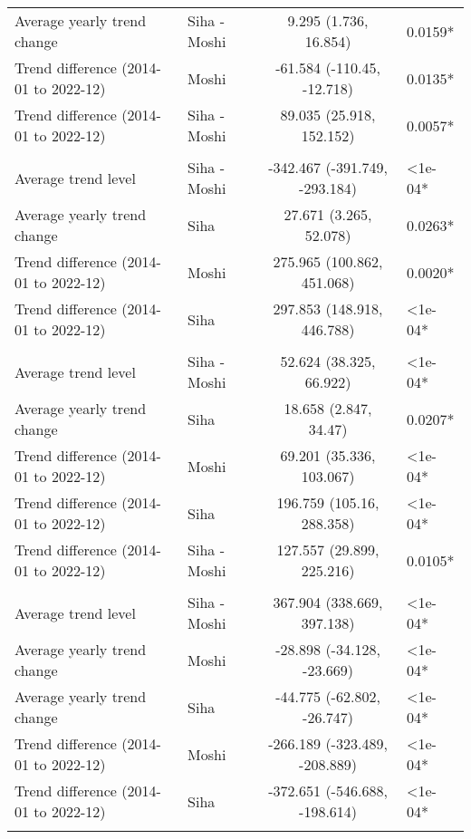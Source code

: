 \begin{longtable}{l|lcl}
Average yearly trend change & Siha - Moshi & 9.295 (1.736, 16.854) & 0.0159* \\ 
Trend difference (2014-01 to 2022-12) & Moshi & -61.584 (-110.45, -12.718) & 0.0135* \\ 
Trend difference (2014-01 to 2022-12) & Siha - Moshi & 89.035 (25.918, 152.152) & 0.0057* \\ 
\midrule\addlinespace[2.5pt]
\multicolumn{4}{l}{Hypertension} \\[2.5pt] 
\midrule\addlinespace[2.5pt]
Average trend level & Siha - Moshi & -342.467 (-391.749, -293.184) & <1e-04* \\ 
Average yearly trend change & Siha & 27.671 (3.265, 52.078) & 0.0263* \\ 
Trend difference (2014-01 to 2022-12) & Moshi & 275.965 (100.862, 451.068) & 0.0020* \\ 
Trend difference (2014-01 to 2022-12) & Siha & 297.853 (148.918, 446.788) & <1e-04* \\ 
\midrule\addlinespace[2.5pt]
\multicolumn{4}{l}{Infectious Eye Disease} \\[2.5pt] 
\midrule\addlinespace[2.5pt]
Average trend level & Siha - Moshi & 52.624 (38.325, 66.922) & <1e-04* \\ 
Average yearly trend change & Siha & 18.658 (2.847, 34.47) & 0.0207* \\ 
Trend difference (2014-01 to 2022-12) & Moshi & 69.201 (35.336, 103.067) & <1e-04* \\ 
Trend difference (2014-01 to 2022-12) & Siha & 196.759 (105.16, 288.358) & <1e-04* \\ 
Trend difference (2014-01 to 2022-12) & Siha - Moshi & 127.557 (29.899, 225.216) & 0.0105* \\ 
\midrule\addlinespace[2.5pt]
\multicolumn{4}{l}{Intestinal Worms} \\[2.5pt] 
\midrule\addlinespace[2.5pt]
Average trend level & Siha - Moshi & 367.904 (338.669, 397.138) & <1e-04* \\ 
Average yearly trend change & Moshi & -28.898 (-34.128, -23.669) & <1e-04* \\ 
Average yearly trend change & Siha & -44.775 (-62.802, -26.747) & <1e-04* \\ 
Trend difference (2014-01 to 2022-12) & Moshi & -266.189 (-323.489, -208.889) & <1e-04* \\ 
Trend difference (2014-01 to 2022-12) & Siha & -372.651 (-546.688, -198.614) & <1e-04* \\ 
\midrule\addlinespace[2.5pt]
\multicolumn{4}{l}{Leprosy} \\[2.5pt] 

\end{longtable}
